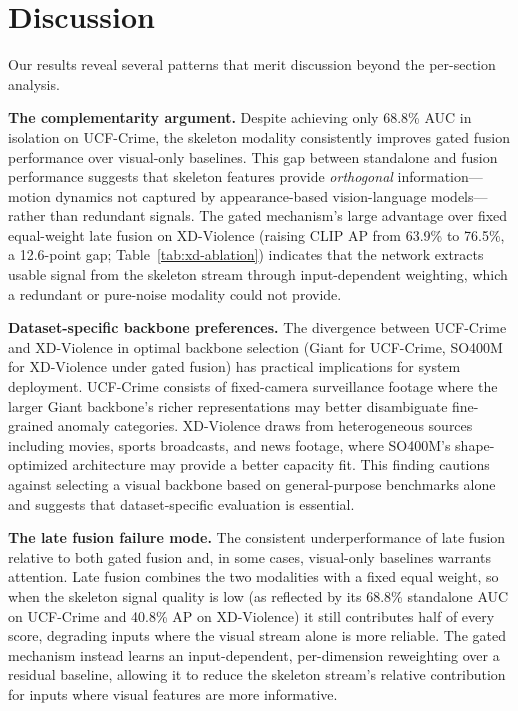 \documentclass[sigconf]{acmart}
\begin{document}
\section{Discussion}

Our results reveal several patterns that merit discussion beyond the per-section analysis.

\textbf{The complementarity argument.} Despite achieving only 68.8\% AUC in isolation on UCF-Crime, the skeleton modality consistently improves gated fusion performance over visual-only baselines. This gap between standalone and fusion performance suggests that skeleton features provide \emph{orthogonal} information---motion dynamics not captured by appearance-based vision-language models---rather than redundant signals. The gated mechanism's large advantage over fixed equal-weight late fusion on XD-Violence (raising CLIP AP from 63.9\% to 76.5\%, a 12.6-point gap; Table~\ref{tab:xd-ablation}) indicates that the network extracts usable signal from the skeleton stream through input-dependent weighting, which a redundant or pure-noise modality could not provide.

\textbf{Dataset-specific backbone preferences.} The divergence between UCF-Crime and XD-Violence in optimal backbone selection (Giant for UCF-Crime, SO400M for XD-Violence under gated fusion) has practical implications for system deployment. UCF-Crime consists of fixed-camera surveillance footage where the larger Giant backbone's richer representations may better disambiguate fine-grained anomaly categories. XD-Violence draws from heterogeneous sources including movies, sports broadcasts, and news footage, where SO400M's shape-optimized architecture may provide a better capacity fit. This finding cautions against selecting a visual backbone based on general-purpose benchmarks alone and suggests that dataset-specific evaluation is essential.

\textbf{The late fusion failure mode.} The consistent underperformance of late fusion relative to both gated fusion and, in some cases, visual-only baselines warrants attention. Late fusion combines the two modalities with a fixed equal weight, so when the skeleton signal quality is low (as reflected by its 68.8\% standalone AUC on UCF-Crime and 40.8\% AP on XD-Violence) it still contributes half of every score, degrading inputs where the visual stream alone is more reliable. The gated mechanism instead learns an input-dependent, per-dimension reweighting over a residual baseline, allowing it to reduce the skeleton stream's relative contribution for inputs where visual features are more informative.
\end{document}
